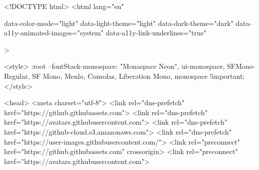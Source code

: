 





<!DOCTYPE html>
<html
  lang="en"
  
  data-color-mode="light" data-light-theme="light" data-dark-theme="dark"
  data-a11y-animated-images="system" data-a11y-link-underlines="true"
  
  >

    <style>
:root {
  --fontStack-monospace: "Monaspace Neon", ui-monospace, SFMono-Regular, SF Mono, Menlo, Consolas, Liberation Mono, monospace !important;
}
</style>




  <head>
    <meta charset="utf-8">
  <link rel="dns-prefetch" href="https://github.githubassets.com">
  <link rel="dns-prefetch" href="https://avatars.githubusercontent.com">
  <link rel="dns-prefetch" href="https://github-cloud.s3.amazonaws.com">
  <link rel="dns-prefetch" href="https://user-images.githubusercontent.com/">
  <link rel="preconnect" href="https://github.githubassets.com" crossorigin>
  <link rel="preconnect" href="https://avatars.githubusercontent.com">

  


